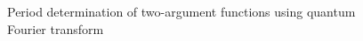 \begin{figure}
\centering



\caption{Period determination of two-argument functions using quantum
  Fourier transform}
\label{figQuantCompQuantPeriodFinding2}
\end{figure}
